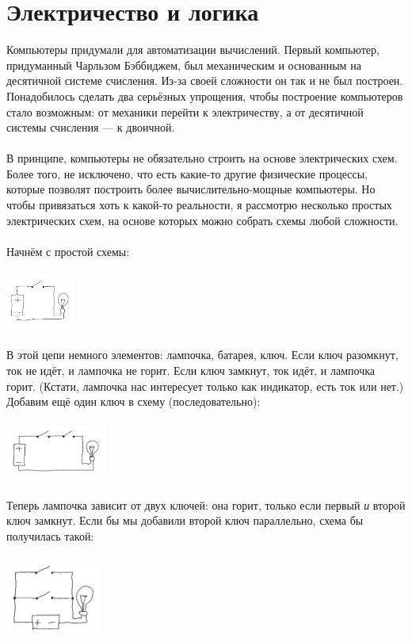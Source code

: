 \documentclass[11pt]{book}
\begin{document}
\section{Электричество и логика}
Компьютеры придумали для автоматизации вычислений.
Первый компьютер, придуманный Чарльзом Бэббиджем, был механическим и основанным на десятичной системе счисления.
Из-за своей сложности он так и не был построен.
Понадобилось сделать два серьёзных упрощения, чтобы построение компьютеров стало возможным:
от механики перейти к электричеству, а от десятичной системы счисления --- к двоичной.
\\ \\
В принципе, компьютеры не обязательно строить на основе электрических схем.
Более того, не исключено, что есть какие-то другие физические процессы,
которые позволят построить более вычислительно-мощные компьютеры.
Но чтобы привязаться хоть к какой-то реальности, я рассмотрю несколько простых электрических схем,
на основе которых можно собрать схемы любой сложности.
\\ \\
Начнём с простой схемы:
\\ \\
\includegraphics[height=0.7in]{pic/2.png}
\\ \\
В этой цепи немного элементов: лампочка, батарея, ключ. Если ключ разомкнут,
ток не идёт, и лампочка не горит. Если ключ замкнут, ток идёт, и лампочка горит.
(Кстати, лампочка нас интересует только как индикатор, есть ток или нет.)
Добавим ещё один ключ в схему (последовательно):
\\ \\
\includegraphics[height=0.7in]{pic/4.png}
\\ \\
Теперь лампочка зависит от двух ключей: она горит, только если первый \emph{и} второй ключ замкнут.
Если бы мы добавили второй ключ параллельно, схема бы получилась такой:
\\ \\
\includegraphics[height=1in]{pic/6.png}
\end{document}

